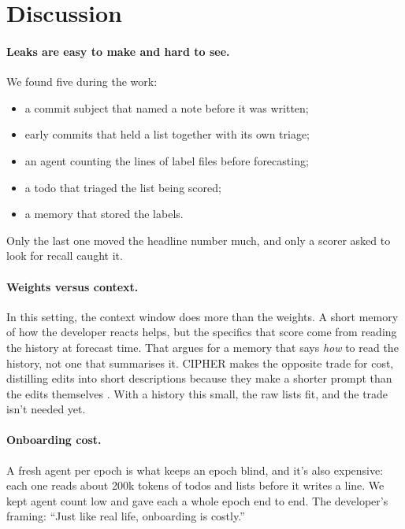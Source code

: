 \documentclass[10pt]{article}
\begin{document}
\section{Discussion}

\paragraph{Leaks are easy to make and hard to see.} We found five during the work:
\begin{itemize}[leftmargin=*]
  \item a commit subject that named a note before it was written;
  \item early commits that held a list together with its own triage;
  \item an agent counting the lines of label files before forecasting;
  \item a todo that triaged the list being scored;
  \item a memory that stored the labels.
\end{itemize}
Only the last one moved the headline number much, and only a scorer asked to look for recall caught it.

\paragraph{Weights versus context.} In this setting, the context window does more than the weights. A short memory of how the developer reacts helps, but the specifics that score come from reading the history at forecast time. That argues for a memory that says \emph{how} to read the history, not one that summarises it. CIPHER makes the opposite trade for cost, distilling edits into short descriptions because they make a shorter prompt than the edits themselves \citep{gao2024aligning}. With a history this small, the raw lists fit, and the trade isn't needed yet.

\paragraph{Onboarding cost.} A fresh agent per epoch is what keeps an epoch blind, and it's also expensive: each one reads about 200k tokens of todos and lists before it writes a line. We kept agent count low and gave each a whole epoch end to end. The developer's framing: ``Just like real life, onboarding is costly.''
\end{document}
